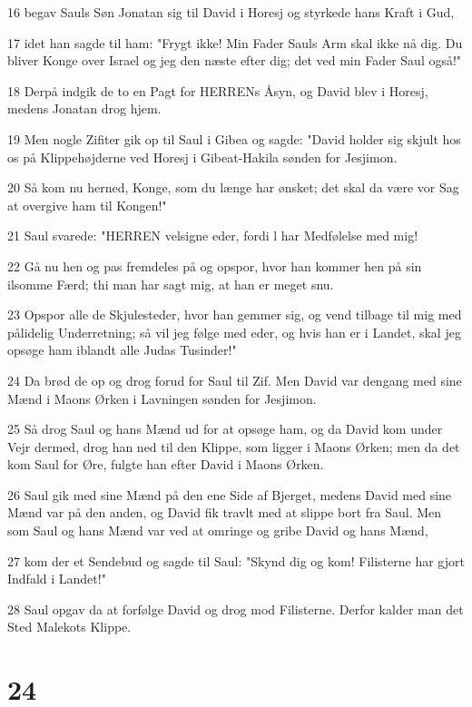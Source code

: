 \par 16 begav Sauls Søn Jonatan sig til David i Horesj og styrkede hans Kraft i Gud,
\par 17 idet han sagde til ham: "Frygt ikke! Min Fader Sauls Arm skal ikke nå dig. Du bliver Konge over Israel og jeg den næste efter dig; det ved min Fader Saul også!"
\par 18 Derpå indgik de to en Pagt for HERRENs Åsyn, og David blev i Horesj, medens Jonatan drog hjem.
\par 19 Men nogle Zifiter gik op til Saul i Gibea og sagde: "David holder sig skjult hos os på Klippehøjderne ved Horesj i Gibeat-Hakila sønden for Jesjimon.
\par 20 Så kom nu herned, Konge, som du længe har ønsket; det skal da være vor Sag at overgive ham til Kongen!"
\par 21 Saul svarede: "HERREN velsigne eder, fordi l har Medfølelse med mig!
\par 22 Gå nu hen og pas fremdeles på og opspor, hvor han kommer hen på sin ilsomme Færd; thi man har sagt mig, at han er meget snu.
\par 23 Opspor alle de Skjulesteder, hvor han gemmer sig, og vend tilbage til mig med pålidelig Underretning; så vil jeg følge med eder, og hvis han er i Landet, skal jeg opsøge ham iblandt alle Judas Tusinder!"
\par 24 Da brød de op og drog forud for Saul til Zif. Men David var dengang med sine Mænd i Maons Ørken i Lavningen sønden for Jesjimon.
\par 25 Så drog Saul og hans Mænd ud for at opsøge ham, og da David kom under Vejr dermed, drog han ned til den Klippe, som ligger i Maons Ørken; men da det kom Saul for Øre, fulgte han efter David i Maons Ørken.
\par 26 Saul gik med sine Mænd på den ene Side af Bjerget, medens David med sine Mænd var på den anden, og David fik travlt med at slippe bort fra Saul. Men som Saul og hans Mænd var ved at omringe og gribe David og hans Mænd,
\par 27 kom der et Sendebud og sagde til Saul: "Skynd dig og kom! Filisterne har gjort Indfald i Landet!"
\par 28 Saul opgav da at forfølge David og drog mod Filisterne. Derfor kalder man det Sted Malekots Klippe.

\chapter{24}

